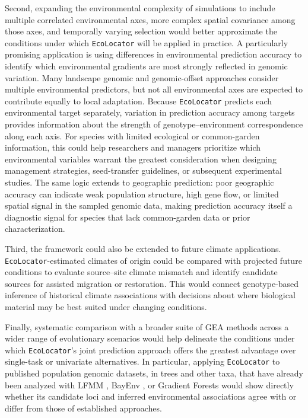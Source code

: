 \documentclass[]{article}
\newcommand{\ecolocator}{\texttt{EcoLocator}\xspace}
\providecommand{\revpoint}[2]{}%
\begin{document}
Second, expanding the environmental complexity
of simulations to include multiple correlated environmental axes,
more complex spatial covariance among those axes,
and temporally varying selection would
better approximate the conditions
under which \ecolocator will be applied in practice. 
A particularly promising application is using 
differences in environmental prediction accuracy
to identify which environmental gradients
are most strongly reflected in genomic variation.
Many landscape genomic and genomic-offset approaches
consider multiple environmental predictors,
but not all environmental axes are expected
to contribute equally to local adaptation.
Because \ecolocator predicts each environmental target separately,
variation in prediction accuracy among targets
provides information about the strength
of genotype--environment correspondence along each axis.
For species with limited ecological or common-garden information,
this could help researchers and managers prioritize
which environmental variables warrant the greatest consideration
when designing management strategies,
seed-transfer guidelines,
or subsequent experimental studies. The same logic extends to geographic
prediction: poor geographic accuracy can indicate weak population
structure, high gene flow, or limited spatial signal in the sampled
genomic data, making prediction accuracy itself a diagnostic signal
for species that lack common-garden data or prior characterization.

Third, the framework could also be extended
to future climate applications.
\ecolocator-estimated climates of origin could be compared
with projected future conditions
to evaluate source--site climate mismatch and 
identify candidate sources 
for assisted migration or restoration.
This would connect genotype-based inference
of historical climate associations
with decisions about where biological material
may be best suited under changing conditions. 

Finally, systematic comparison
with a broader suite of GEA methods
across a wider range of evolutionary scenarios
would help delineate the conditions
under which \ecolocator's joint prediction approach
offers the greatest advantage
over single-task or univariate alternatives.
In particular, applying \ecolocator to published population genomic datasets,
in trees and other taxa, that have already been analyzed with
LFMM \citep{frichot_lfmm_2013}, BayEnv \citep{coop_using_2010},
or Gradient Forests \citep{fitzpatrick_gradient_2015}\revpoint{2}{20}
would show directly whether its candidate loci
and inferred environmental associations
agree with or differ from those of established approaches.
\end{document}
